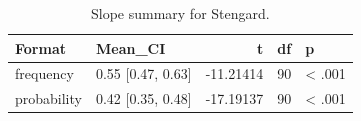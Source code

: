 \begin{table}
\centering
\caption{Slope summary for Stengard.}
\centering
\fontsize{10}{12}\selectfont
\begin{tabular}[t]{llrrl}
\toprule
Format & Mean\_CI & t & df & p\\
\midrule
frequency & 0.55 [0.47, 0.63] & -11.21414 & 90 & < .001\\
probability & 0.42 [0.35, 0.48] & -17.19137 & 90 & < .001\\
\bottomrule
\end{tabular}
\end{table}
